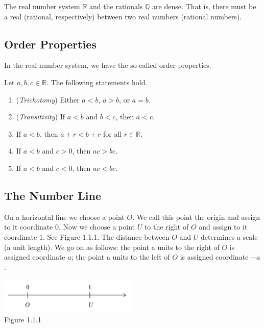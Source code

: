 \documentclass[11pt]{book}
\theoremstyle{break}
\theoremstyle{no_label}
\newcommand{\bbR}{\mathbb{R}}
\newcommand{\figtag}[1]{\\[-1.2em]Figure {#1}}
\numberwithin{equation}{section}
\begin{document}
\begin{proposition}
    The real number system $\bbR$ and the rationals $\mathbb{Q}$ are dense. That is, there must be a real (rational, respectively) between two real numbers (rational numbers).
\end{proposition}

\subsection*{Order Properties}

In the real number system, we have the so-called order properties. 

\begin{theorem}
    Let $a, b, c\in\bbR$. The following statements hold.
    \begin{enumerate}
        \item (\textit{Trichotomy}) Either $a<b$, $a>b$, or $a=b$.
        \item (\textit{Transitivity}) If $a<b$ and $b<c$, then $a<c$.
        \item If $a<b$, then $a+r<b+r$ for all $r\in\bbR$.
        \item If $a<b$ and $c>0$, then $ac>bc$.
        \item If $a<b$ and $c<0$, then $ac<bc$.
    \end{enumerate}
\end{theorem}

\subsection*{The Number Line}

On a horizontal line we choose a point $O$. We call this point the origin and assign to it coordinate $0$. Now we choose a point $U$ to the right of $O$ and assign to it coordinate $1$. See Figure 1.1.1. The distance between $O$ and $U$ determines a scale (a unit length). We go on as follows: the point a units to the right of $O$ is assigned coordinate $a$; the point a units to the left of $O$ is assigned coordinate $-a$.

\begin{center}
    \includegraphics[width=0.5\textwidth]{number_line.PNG}\figtag{1.1.1}
\end{center}
\end{document}
